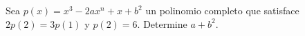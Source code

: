 \noindent
Sea $ p(x)=x^3-2ax^n+x+b^2 $ un polinomio completo que satisface $ 2p(2)=3p(1) $ y $ p(2)=6 $. Determine $ a+b^2 $.
